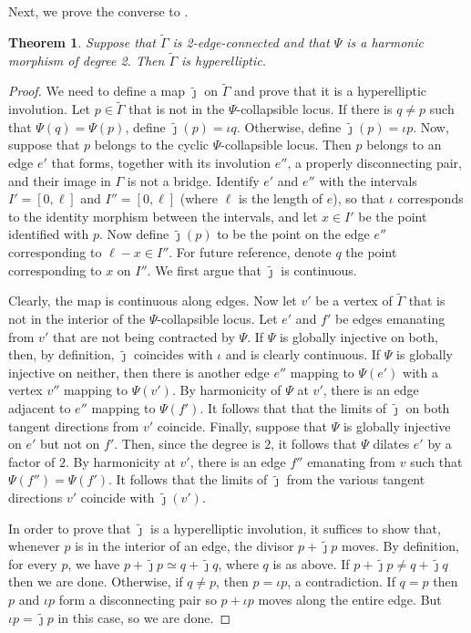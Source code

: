 \documentclass[11pt]{article}
\newtheorem{theorem}[theo]{Theorem}
\theoremstyle{definition}
\numberwithin{equation}{section}
\theoremstyle{definition}
\newcommand{\tj}{\widetilde{\jmath}}
\newcommand{\wt}[1]{\widetilde{#1}}
\begin{document}
Next, we prove the converse to .
\begin{theorem}\label{thm:harmonicImpliesHyperelliptic}
    Suppose that $\wt\Gamma$ is 2-edge-connected and that
    $\Psi$ is a  harmonic morphism of degree 2. Then $\wt\Gamma$ is hyperelliptic.

   
\end{theorem}

\begin{proof}
    We need to define a map $\tj$ on $\wt\Gamma$ and prove that it is a hyperelliptic involution.   Let $p\in\wt\Gamma$ that is not in the $\Psi$-collapsible locus.  If there is $q\neq p$ such that $\Psi(q)=\Psi(p)$, define  $\tj(p) = \iota q$. Otherwise, define $\tj(p) = \iota p$.  Now, suppose that $p$ belongs to the cyclic $\Psi$-collapsible locus.  Then $p$ belongs to an edge $e'$ that forms, together with its involution $e''$, a properly disconnecting pair, and their image in $\Gamma$ is not a bridge. 
 Identify $e'$ and $e''$ with the intervals $I'=[0,\ell]$ and $I''=[0,\ell]$ (where $\ell$ is the length of $e$), so that $\iota$ corresponds to the identity morphism between the intervals, and let $x\in I'$ be the point identified with  $p$. Now define   $\tj(p)$ to be the point on the edge $e''$ corresponding to $\ell-x\in I''$.   For future reference, denote $q$ the point corresponding to $x$ on $I''$.
    We first argue  that $\tj$ is  continuous. 
    
    Clearly, the map is continuous along edges. Now let $v'$ be a vertex of $\wt\Gamma$ that is not in the interior of the $\Psi$-collapsible locus. Let $e'$ and $f'$ be edges emanating from $v'$ that are not being contracted by $\Psi$. If $\Psi$ is globally injective on both, then, by definition, $\tj$ coincides with $\iota$ and is clearly continuous.  If $\Psi$ is globally injective on neither, then there is another edge $e''$ mapping to $\Psi(e')$ with a vertex $v''$ mapping to $\Psi(v')$. By harmonicity of $\Psi$ at $v'$, there is an edge adjacent to $e''$ mapping to $\Psi(f')$. It follows that that the limits of $\tj$ on both tangent directions from $v'$ coincide. 
    Finally, suppose that $\Psi$ is globally injective on $e'$ but not on $f'$. Then, since the degree is $2$, it follows that $\Psi$ dilates $e'$ by a factor of $2$. By harmonicity at $v'$,  there is an edge $f''$ emanating from $v$ such that $\Psi(f'') = \Psi(f')$. It follows that  the limits of $\tj$ from the various tangent directions $v'$ coincide with $\tj(v')$. 

   In order to prove that $\tj$ is a hyperelliptic involution,  it suffices to show that, whenever $p$ is in the interior of an edge, the divisor $p+\tj p$ moves. 
   By definition, for every $p$, we have $p + \tj p\simeq q + \tj q$, where $q$ is as above. If $p + \tj p \neq q + \tj q$ then we are done. Otherwise, if $q\neq p$, then $p = \iota p$, a contradiction. If $q = p$  
    then $p$ and $\iota p$  form a disconnecting pair so $p+\iota p$ moves along the entire edge. But $\iota p = \tj p$ in this case, so we are done. 
   \end{proof}
\end{document}
